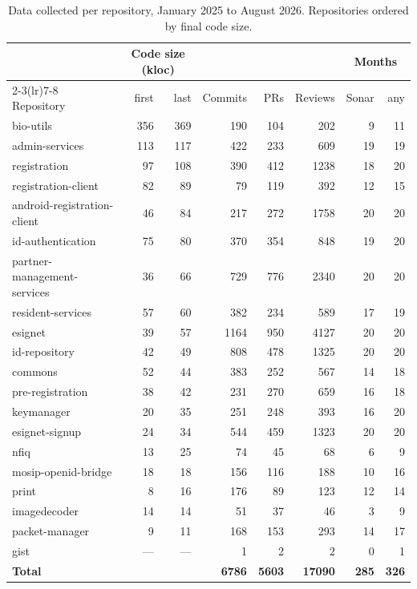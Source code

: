 \begin{table}[htbp]
\centering
\caption{Data collected per repository, January 2025 to August 2026.
Repositories ordered by final code size.}
\label{tab:perrepo}
\small
\begin{tabular}{@{}lrrrrrrr@{}}
\toprule
 & \multicolumn{2}{c}{Code size (kloc)} & & & & \multicolumn{2}{c}{Months} \\
\cmidrule(lr){2-3}\cmidrule(lr){7-8}
Repository & first & last & Commits & PRs & Reviews & Sonar & any \\
\midrule
bio-utils                   & 356 & 369 & 190  & 104 & 202  &  9 & 11 \\
admin-services              & 113 & 117 & 422  & 233 & 609  & 19 & 19 \\
registration                &  97 & 108 & 390  & 412 & 1238 & 18 & 20 \\
registration-client         &  82 &  89 &  79  & 119 & 392  & 12 & 15 \\
android-registration-client &  46 &  84 & 217  & 272 & 1758 & 20 & 20 \\
id-authentication           &  75 &  80 & 370  & 354 & 848  & 19 & 20 \\
partner-management-services &  36 &  66 & 729  & 776 & 2340 & 20 & 20 \\
resident-services           &  57 &  60 & 382  & 234 & 589  & 17 & 19 \\
esignet                     &  39 &  57 & 1164 & 950 & 4127 & 20 & 20 \\
id-repository               &  42 &  49 & 808  & 478 & 1325 & 20 & 20 \\
commons                     &  52 &  44 & 383  & 252 & 567  & 14 & 18 \\
pre-registration            &  38 &  42 & 231  & 270 & 659  & 16 & 18 \\
keymanager                  &  20 &  35 & 251  & 248 & 393  & 16 & 20 \\
esignet-signup              &  24 &  34 & 544  & 459 & 1323 & 20 & 20 \\
nfiq                        &  13 &  25 &  74  &  45 &  68  &  6 &  9 \\
mosip-openid-bridge         &  18 &  18 & 156  & 116 & 188  & 10 & 16 \\
print                       &   8 &  16 & 176  &  89 & 123  & 12 & 14 \\
imagedecoder                &  14 &  14 &  51  &  37 &  46  &  3 &  9 \\
packet-manager              &   9 &  11 & 168  & 153 & 293  & 14 & 17 \\
gist                        & --- & --- &   1  &   2 &   2  &  0 &  1 \\
\midrule
\textbf{Total}              &     &     & \textbf{6786} & \textbf{5603} & \textbf{17090} & \textbf{285} & \textbf{326} \\
\bottomrule
\end{tabular}
\end{table}


